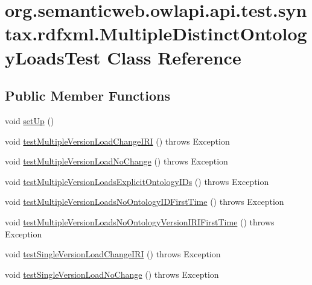 \hypertarget{classorg_1_1semanticweb_1_1owlapi_1_1api_1_1test_1_1syntax_1_1rdfxml_1_1_multiple_distinct_ontology_loads_test}{\section{org.\-semanticweb.\-owlapi.\-api.\-test.\-syntax.\-rdfxml.\-Multiple\-Distinct\-Ontology\-Loads\-Test Class Reference}
\label{classorg_1_1semanticweb_1_1owlapi_1_1api_1_1test_1_1syntax_1_1rdfxml_1_1_multiple_distinct_ontology_loads_test}
}
\subsection*{Public Member Functions}
\begin{DoxyCompactItemize}
\item 
void \hyperlink{classorg_1_1semanticweb_1_1owlapi_1_1api_1_1test_1_1syntax_1_1rdfxml_1_1_multiple_distinct_ontology_loads_test_a42bcb39afd3ebe36252eb46690787dce}{set\-Up} ()
\item 
void \hyperlink{classorg_1_1semanticweb_1_1owlapi_1_1api_1_1test_1_1syntax_1_1rdfxml_1_1_multiple_distinct_ontology_loads_test_af755fb1489402b98b343f17c3d50dca6}{test\-Multiple\-Version\-Load\-Change\-I\-R\-I} ()  throws Exception 
\item 
void \hyperlink{classorg_1_1semanticweb_1_1owlapi_1_1api_1_1test_1_1syntax_1_1rdfxml_1_1_multiple_distinct_ontology_loads_test_aa3675964743d9af47bf4c0d6a6e3c19f}{test\-Multiple\-Version\-Load\-No\-Change} ()  throws Exception 
\item 
void \hyperlink{classorg_1_1semanticweb_1_1owlapi_1_1api_1_1test_1_1syntax_1_1rdfxml_1_1_multiple_distinct_ontology_loads_test_acbfe3aa6147a703e4f7c8ec004e74687}{test\-Multiple\-Version\-Loads\-Explicit\-Ontology\-I\-Ds} ()  throws Exception 
\item 
void \hyperlink{classorg_1_1semanticweb_1_1owlapi_1_1api_1_1test_1_1syntax_1_1rdfxml_1_1_multiple_distinct_ontology_loads_test_a7b584317fe4e0168409620bcf902e55d}{test\-Multiple\-Version\-Loads\-No\-Ontology\-I\-D\-First\-Time} ()  throws Exception 
\item 
void \hyperlink{classorg_1_1semanticweb_1_1owlapi_1_1api_1_1test_1_1syntax_1_1rdfxml_1_1_multiple_distinct_ontology_loads_test_a7ee5364f328bcb6513c2ac35dbace34e}{test\-Multiple\-Version\-Loads\-No\-Ontology\-Version\-I\-R\-I\-First\-Time} ()  throws Exception 
\item 
void \hyperlink{classorg_1_1semanticweb_1_1owlapi_1_1api_1_1test_1_1syntax_1_1rdfxml_1_1_multiple_distinct_ontology_loads_test_a15b5de551cb0e91599a74a254992cc18}{test\-Single\-Version\-Load\-Change\-I\-R\-I} ()  throws Exception 
\item 
void \hyperlink{classorg_1_1semanticweb_1_1owlapi_1_1api_1_1test_1_1syntax_1_1rdfxml_1_1_multiple_distinct_ontology_loads_test_a8c4c534835f0b571555d697e6cd4da4d}{test\-Single\-Version\-Load\-No\-Change} ()  throws Exception 
\end{DoxyCompactItemize}
